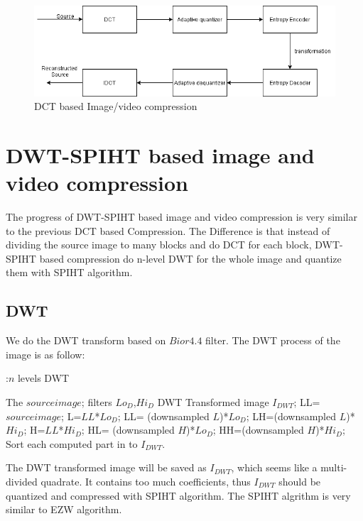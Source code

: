 \documentclass[twocolumn]{article}  %
\begin{document}
\begin{figure}[ht]
\centering
\includegraphics[scale=0.44]{flowDiagram.png}
\caption{DCT based Image/video compression}
\label{fig:1}
\end{figure}

\newpage
\section {DWT-SPIHT based image and video compression}
The progress of DWT-SPIHT based image and video compression is very similar to the previous DCT based Compression. The Difference is that instead of dividing the source image to many blocks and do DCT for each block, DWT-SPIHT based compression do n-level DWT for the whole image and quantize them with SPIHT algorithm. 
\subsection{DWT}
We do the DWT transform based on $Bior 4.4$ filter\cite{JPEG}. The DWT process of the image is as follow:

\begin{algorithm} 
  \caption{:$n$ levels DWT}
	\begin{algorithmic}
	\Require
      The $source image$;
	 filters $Lo_D$,$Hi_D$
    \Ensure
     	 DWT Transformed image $I_{DWT}$;
	\State	
	LL=$source image$;
	\State L=$LL$*$Lo_D$;
	\State LL=	(downsampled $L$)*$Lo_D$;
	\State LH=(downsampled $L$)*$Hi_D$;
	\State H=$LL$*$Hi_D$;
	\State HL=	(downsampled $H$)*$Lo_D$;
	\State HH=(downsampled $H$)*$Hi_D$;
	\State Sort each computed part in to $I_{DWT}$.
    \EndFor	
	\end{algorithmic}
\end{algorithm} 

The DWT transformed image will be saved as $I_{DWT}$, which seems like a multi-divided quadrate. It contains too much coefficients, thus $I_{DWT}$ should be quantized and compressed with SPIHT algorithm. The SPIHT algrithm is very similar to EZW algorithm.
  
\end{document}
